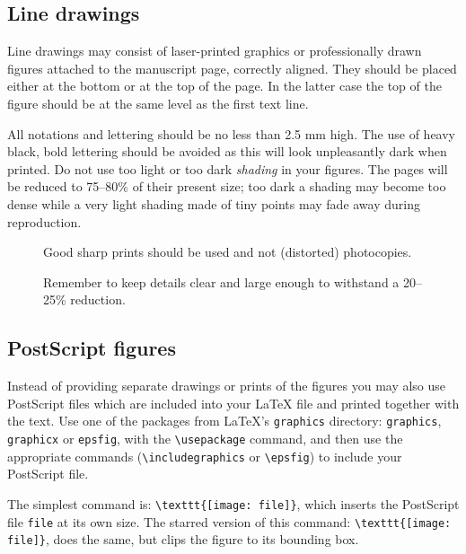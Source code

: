\documentclass[fleqn,12pt,twoside]{article}
\begin{document}
\subsection{Line drawings}

Line drawings may consist of laser-printed graphics or professionally
drawn figures attached to the manuscript page, correctly aligned. They
should be placed either at the bottom or at the top of the page. In
the latter case the top of the figure should be at the same level as
the first text line.

All notations and lettering should be no less than 2.5 mm high. The
use of heavy black, bold lettering should be avoided as this will look
unpleasantly dark when printed. Do not use too light or too dark
\textit{shading} in your figures. The pages will be reduced to
75--80\% of their present size; too dark a shading may become too
dense while a very light shading made of tiny points may fade away
during reproduction.

\begin{figure}[htb]
\begin{minipage}[t]{80mm}
\framebox[79mm]{\rule[-26mm]{0mm}{52mm}}
\caption{Good sharp prints should be used and not (distorted) photocopies.}
\label{fig:largenenough}
\end{minipage}
%
\hspace{\fill}
%
\begin{minipage}[t]{75mm}
\framebox[74mm]{\rule[-26mm]{0mm}{52mm}}
\caption{Remember to keep details clear and large enough to
         withstand a 20--25\% reduction.}
\label{fig:toosmall}
\end{minipage}
\end{figure}

\subsection{PostScript figures}

Instead of providing separate drawings or prints of the figures you
may also use PostScript files which are included into your \LaTeX{}
file and printed together with the text. Use one of the packages from
\LaTeX's \texttt{graphics} directory: \texttt{graphics},
\texttt{graphicx} or \texttt{epsfig}, with the \verb|\usepackage|
command, and then use the appropriate commands
\linebreak
(\verb|\includegraphics| or \verb|\epsfig|) to include your PostScript
file.

The simplest command is: \verb|\texttt{[image: file]}|, which inserts the
PostScript file \texttt{file} at its own size. The starred version of
this command: \verb|\texttt{[image: file]}|, does the same, but clips
the figure to its bounding box.
\end{document}

